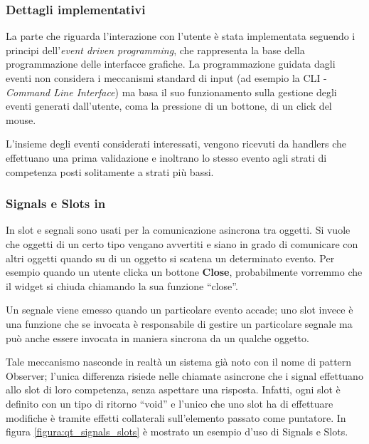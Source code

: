\subsubsection*{Dettagli implementativi}
La parte che riguarda l'interazione con l'utente è stata implementata seguendo i principi dell'\emph{event driven programming}, che rappresenta la base della programmazione delle interfacce grafiche. La programmazione guidata dagli eventi non considera i meccanismi standard di input (ad esempio la CLI - \emph{Command Line Interface}) ma basa il suo funzionamento sulla gestione degli eventi generati dall'utente, coma la pressione di un bottone, di un click del mouse. 

L'insieme degli eventi considerati interessati, vengono ricevuti da handlers che effettuano una prima validazione e inoltrano lo stesso evento agli strati di competenza posti solitamente a strati più bassi.

\subsubsection*{Signals e Slots in \qt{}}
In \qt{} slot e segnali sono usati per la comunicazione asincrona tra oggetti.
Si vuole che oggetti di un certo tipo vengano avvertiti e siano in grado di comunicare con altri oggetti quando su di un oggetto si scatena un determinato evento. Per esempio quando un utente clicka un bottone \textbf{Close}, probabilmente vorremmo che il widget si chiuda chiamando la sua funzione ``close''.

Un segnale viene emesso quando un particolare evento accade; uno slot invece è una funzione che se invocata è responsabile di gestire un particolare segnale ma può anche essere invocata in maniera sincrona da un qualche oggetto.

Tale meccanismo nasconde in realtà un sistema già noto con il nome di pattern Observer; l'unica differenza risiede nelle chiamate asincrone che i signal effettuano allo slot di loro competenza, senza aspettare una risposta. Infatti, ogni slot è definito con un tipo di ritorno ``void'' e l'unico che uno slot ha di effettuare modifiche è tramite effetti collaterali sull'elemento passato come puntatore. In figura \ref{figura:qt_signals_slots} è mostrato un esempio d'uso di Signals e Slots.

